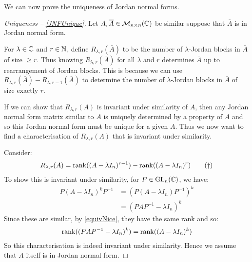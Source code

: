 \documentclass[../main.tex]{subfiles}
\begin{document}
We can now prove the uniqueness of Jordan normal forms.
\begin{proof}[Uniqueness -- \cref{JNFUnique}]
  Let $A, \overline{A} \in \mathcal{M}_{n \times n}(\mathbb{C})$ be similar suppose that $\overline{A}$ is in Jordan normal form.

  For $\lambda \in \mathbb{C}$ and $r \in \mathbb{N}$, define $R_{\lambda, r}(\overline{A})$ to be the number of $\lambda$-Jordan blocks in $\overline{A}$ of size $\geq r$.
  Thus knowing $R_{\lambda, r}(\overline{A})$ for all $\lambda$ and $r$ determines $\overline{A}$ up to rearrangement of Jordan blocks.
  This is because we can use $R_{\lambda, r}(\overline{A}) - R_{\lambda, r - 1}(\overline{A})$ to determine the number of $\lambda$-Jordan blocks in $\overline{A}$ of size exactly $r$.

  If we can show that $R_{\lambda, r}(A)$ is invariant under similarity of $A$, then any Jordan normal form matrix similar to $A$ is uniquely determined by a property of $A$ and so this Jordan normal form must be unique for a given $A$.
  Thus we now want to find a characterisation of $R_{\lambda, r}(A)$ that is invariant under similarity.

  Consider:
  \begin{equation}
    R_{\lambda, r}(A) = \operatorname{rank}((A - \lambda I_n)^{r - 1}) - \operatorname{rank}((A - \lambda I_n)^{r}) \label{invChara} \tag{\dag}
  \end{equation}
  To show this is invariant under similarity, for $P \in \mathrm{GL}_n(\mathbb{C})$, we have:
  \begin{align*}
    P(A - \lambda I_n)^{k} P^{-1} &= (P(A - \lambda I_n)P^{-1})^{k} \\
                                  &= (PAP^{-1} - \lambda I_n)^{k}
  \end{align*}
  Since these are similar, by \cref{equivNice}, they have the same rank and so:
  \[
    \operatorname{rank}((PAP^{-1} - \lambda I_n)^{k}) = \operatorname{rank}((A - \lambda I_n)^{k})
  \]
  So this characterisation is indeed invariant under similarity.
  Hence we assume that $A$ itself is in Jordan normal form.


\end{proof}
\end{document}
